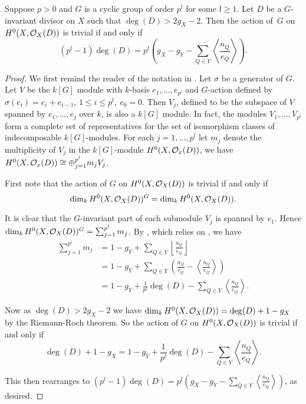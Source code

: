     \begin{prop}\label{nakaj}
    Suppose $p>0$ and $G$ is a cyclic group of order $p^l$ for some $l\geq 1$.
    Let $D$ be a $G$-invariant divisor on $X$ such that $\deg(D)>2g_X-2$.
    Then the action of~$G$ on $H^0(X,{\cal O}_X(D))$ is trivial if and only if
        \[ 
        (p^l-1)\deg(D)=p^l\left(g_X-g_Y-\sum_{Q\in Y}\left\langle \frac{n_Q}{e_Q} \right\rangle\right).
        \]
    \end{prop}
    \begin{proof}
    We first remind the reader of the notation in \cite{kako}.
    Let $\sigma$ be a generator of $G$.
    Let $V$ be the $k[G]$ module with $k$-basis $e_1,\ldots ,e_{p^l}$ and $G$-action defined by $\sigma( e_i)=e_i+e_{i-1}$, $1\leq i \leq p^l,\ e_0=0$.
    Then $V_j$, defined to be the subspace of $V$ spanned by $e_1,\ldots ,e_j$ over $k$, is also a $k[G]$ module.
    In fact, the modules $V_1,\ldots ,V_{p^l}$ form a complete set of representatives for the set of isomorphism classes of indecomposable $k[G]$-modules. For each $j=1,\ldots,p^l$ let $m_j$ denote the multiplicity of $V_j$ in the $k[G]$-module $H^0(X,{\cal O}_x(D))$, \ie we have $H^0(X,{\cal O}_x(D))\cong \oplus_{j=1}^{p^l}m_jV_j$.
    
    
    
    First note that the action of $G$ on $H^0(X,{\cal O}_X(D))$ is trivial if and only if
        \begin{equation}\label{triva}
        \dim_k H^0(X,{\cal O}_X(D))^G =\dim_k H^0(X,{\cal O}_X(D)).
        \end{equation}
    
    It is clear that the $G$-invariant part of each submodule $V_j$ is spanned by $e_1$. 
    Hence $\dim_kH^0(X,{\cal O}_X(D))^G = \sum_{j=1}^{p^l} m_j$.
    By \cite[Thm. 2.1]{quaddiffequi}, which relies on \cite{cohogsheaves}, we have
        \begin{align*}
        \sum_{j=1}^{p^l} m_j & =  1- g_Y +\sum_{Q\in Y} \left\lfloor \frac{n_Q}{e_Q}\right\rfloor\\
        & =  1- g_Y + \sum_{Q\in Y} \left( \frac{n_Q}{e_Q} - \left\langle \frac{n_Q}{e_Q}\right\rangle \right) \\
        & =  1 - g_Y + \frac{1}{p^l}\deg(D) - \sum_{Q\in Y} \left\langle \frac{n_Q}{e_Q} \right\rangle.
        \end{align*}
    
    Now as $\deg(D)>2g_X-2$ we have $\dim_kH^0(X,{\cal O}_X(D)) =\deg(D)+1-g_X$ by the Riemann-Roch theorem. 
    So the action of $G$ on $H^0(X,{\cal O}_X(D))$ is trivial if and only if
        \begin{equation*}
        \deg(D)+1-g_X  = 1 - g_Y + \frac{1}{p^l}\deg(D) - \sum_{Q\in Y}\left\langle \frac{n_Q}{e_Q} \right\rangle. \label{hi}
        \end{equation*}
    
    This then rearranges to $(p^l-1)\deg(D)=p^l\left(g_X-g_Y-\sum_{Q\in Y}\left\langle \frac{n_Q}{e_Q} \right\rangle\right)$, as desired.
    \end{proof}

